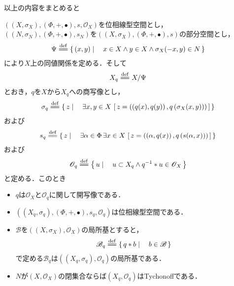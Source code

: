 	以上の内容をまとめると
	\begin{screen}
		\begin{thm}[位相線型空間を部分空間で割ったときの商位相は線型位相である]
			$\left((X,\sigma_X),(\Phi,+,\bullet),s,\mathscr{O}_X\right)$を位相線型空間とし，
			$\left((N,\sigma_N),(\Phi,+,\bullet),s_N\right)$を$\left((X,\sigma_X),(\Phi,+,\bullet),s\right)$の部分空間とし，
			\begin{align}
				\Psi \defeq \Set{(x,y)}{x \in X \wedge y \in X \wedge \sigma_X(-x,y) \in N}
			\end{align}
			により$X$上の同値関係を定める．そして
			\begin{align}
				X_q \defeq X/\Psi
			\end{align}
			とおき，$q$を$X$から$X_q$への商写像とし，
			\begin{align}
				\sigma_q \defeq \Set{z}{\exists x,y \in X\, 
				\left[\, z=\left(\left(q(x),q(y)\right),q\left(\sigma_X(x,y)\right)\right)\, \right]}
			\end{align}
			および
			\begin{align}
				s_q \defeq \Set{z}{\exists \alpha \in \Phi\, \exists x \in X\, 
				\left[\, z=\left(\left(\alpha,q(x)\right),q\left(s(\alpha,x)\right)\right)\, \right]}
			\end{align}
			および
			\begin{align}
				\mathscr{O}_q \defeq \Set{u}{u \subset X_q \wedge q^{-1} \ast u \in \mathscr{O}_X}
			\end{align}
			と定める．このとき
			\begin{itemize}
				\item $q$は$\mathscr{O}_X$と$\mathscr{O}_q$に関して開写像である．
				
				\item $\left(\left(X_q,\sigma_q\right),\left(\Phi,+,\bullet\right),s_q,\mathscr{O}_q\right)$は位相線型空間である．
				
				\item $\mathscr{B}$を$\left((X,\sigma_X),\mathscr{O}_X\right)$の局所基とすると，
					\begin{align}
						\mathscr{B}_q \defeq \Set{q \ast b}{b \in \mathscr{B}}
					\end{align}
					で定める$\mathscr{B}_q$は$\left((X_q,\sigma_q),\mathscr{O}_q\right)$の局所基である．
				
				\item $N$が$(X,\mathscr{O}_X)$の閉集合ならば$(X_q,\mathscr{O}_q)$はTychonoffである．
			\end{itemize}
		\end{thm}
	\end{screen}
	
